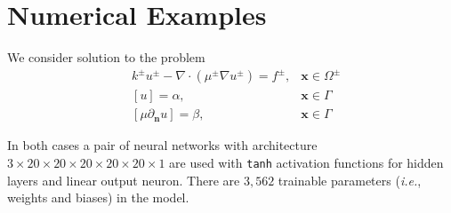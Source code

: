 \documentclass{elsarticle}
\begin{document}
\section{Numerical Examples}

We consider solution to the problem
\begin{align*}
	 & k^{\pm}u^{\pm} - \nabla \cdot (\mu^{\pm}\nabla u^\pm)=f^{\pm}, & \mathbf{x}\in\Omega^\pm \\
	 & [u]=\alpha,                                                    & \mathbf{x} \in \Gamma   \\
	 & [\mu \partial_{\mathbf{n}}u]=\beta,                            & \mathbf{x} \in \Gamma
\end{align*}


In both cases a pair of neural networks with architecture $3\times 20 \times 20 \times 20 \times 20  \times 20 \times 1$ are used with \texttt{tanh} activation functions for hidden layers and linear output neuron. There are $3,562$ trainable parameters (\textit{i.e.}, weights and biases) in the model.

%



\end{document}
